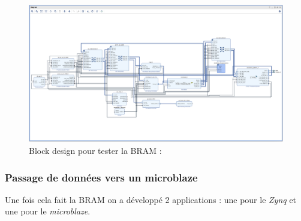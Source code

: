 \documentclass[12pt,a4paper]{article}
\begin{document}
\begin{figure}[H]
	\centering
		\includegraphics[width=\linewidth]{im/bram1.png}	
	\caption{Block design pour tester la BRAM :}
	\label{fig-bram1}
\end{figure}


\subsubsection{Passage de données vers un microblaze}
Une fois cela fait la BRAM on a développé 2 applications : une pour le \textit{Zynq} et une pour le \textit{microblaze}.
\end{document}
